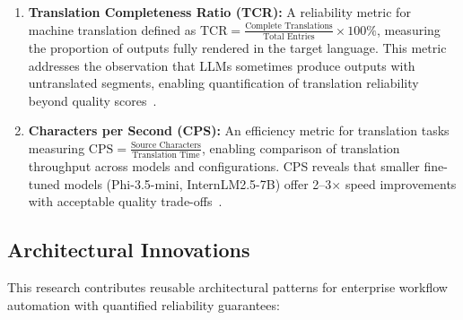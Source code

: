 \begin{enumerate}[leftmargin=*]
    \item \textbf{Translation Completeness Ratio (TCR):} A reliability metric for machine translation defined as $\text{TCR} = \frac{\text{Complete Translations}}{\text{Total Entries}} \times 100\%$, measuring the proportion of outputs fully rendered in the target language. This metric addresses the observation that LLMs sometimes produce outputs with untranslated segments, enabling quantification of translation reliability beyond quality scores~\cite{huang2025translation}.
    
    \item \textbf{Characters per Second (CPS):} An efficiency metric for translation tasks measuring $\text{CPS} = \frac{\text{Source Characters}}{\text{Translation Time}}$, enabling comparison of translation throughput across models and configurations. CPS reveals that smaller fine-tuned models (Phi-3.5-mini, InternLM2.5-7B) offer 2--3$\times$ speed improvements with acceptable quality trade-offs~\cite{huang2025translation}.
\end{enumerate}

\subsection{Architectural Innovations}

This research contributes reusable architectural patterns for enterprise workflow automation with quantified reliability guarantees:

